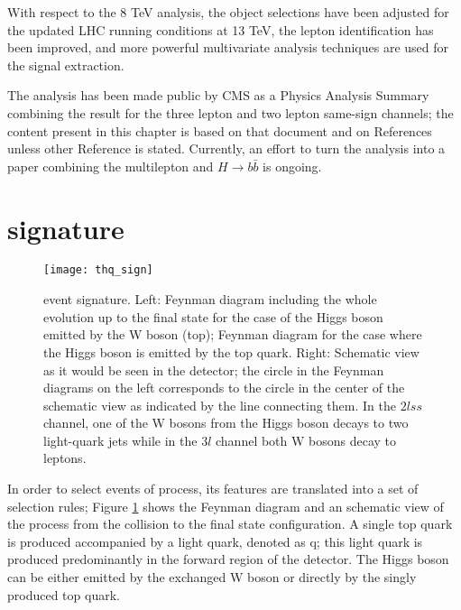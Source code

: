 With respect to the 8 TeV analysis, the object selections have been adjusted for the updated LHC running conditions at 13 TeV, the lepton identification has been improved, and more powerful multivariate analysis techniques are used for the signal extraction.

The analysis has been made public by CMS as a Physics Analysis Summary \cite{CMS_PAS_HIG_17-005} combining the result for the three lepton and two lepton same-sign channels; the content present in this chapter is based on that document and on References ~\cite{CMS_AN_2016-211, CMS_AN_2017-029} unless other Reference is stated. Currently, an effort to turn the analysis into a paper combining the multilepton and $H \to b\bar{b}$ is ongoing. 


\section{\tHq signature}\label{sec:thq_sign}

\begin{figure}[!h]
\begin{center}
\texttt{[image: thq\_sign]}
\end{center}
\caption[\tHq event signature]{\tHq event signature. Left: Feynman diagram including the whole evolution up to the final state for the case of the Higgs boson emitted by the W boson (top); Feynman diagram for the case where the Higgs boson is emitted by the top quark. Right: Schematic view as it would be seen in the detector; the circle in the Feynman diagrams on the left corresponds to the circle in the center of the schematic view as indicated by the line connecting them. In the $2lss$ channel, one of the W bosons from the Higgs boson decays to two light-quark jets while in the $3l$ channel both W bosons decay to leptons.}
\label{fig:thq_sign}
\end{figure}

In order to select events of \tHq process, its features are translated into a set of selection rules; Figure \ref{fig:thq_sign} shows the Feynman diagram and an schematic view of the \tHq process from the \pp collision to the final state configuration. A single top quark is produced accompanied by a light quark, denoted as q; this light quark is produced predominantly in the forward region of the detector. The Higgs boson can be either emitted by the exchanged W boson or directly by the singly produced top quark.

